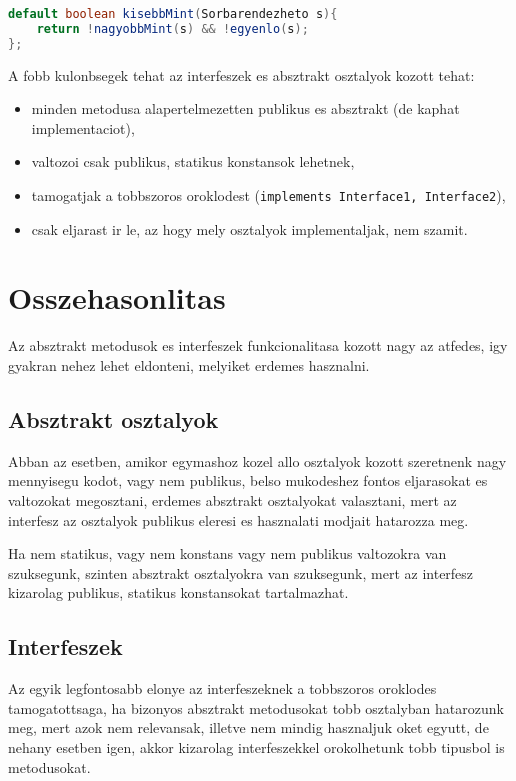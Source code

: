 \documentclass{article}
\let\l\lstinline
\begin{document}
\begin{lstlisting}[language=Java, caption=Default metodus]
default boolean kisebbMint(Sorbarendezheto s){
    return !nagyobbMint(s) && !egyenlo(s);
};
\end{lstlisting}

A fobb kulonbsegek tehat az interfeszek es absztrakt osztalyok kozott tehat:
\begin{itemize}
    \item minden metodusa alapertelmezetten publikus es absztrakt (de kaphat implementaciot),
    \item valtozoi csak publikus, statikus konstansok lehetnek,
    \item tamogatjak a tobbszoros oroklodest (\l{implements Interface1, Interface2}),
    \item csak eljarast ir le, az hogy mely osztalyok implementaljak, nem szamit.
\end{itemize}

\newpage

\section{Osszehasonlitas}

Az absztrakt metodusok es interfeszek funkcionalitasa kozott nagy az atfedes, igy gyakran nehez lehet eldonteni, melyiket erdemes hasznalni.

\subsection{Absztrakt osztalyok}
Abban az esetben, amikor egymashoz kozel allo osztalyok kozott szeretnenk nagy mennyisegu kodot, vagy nem publikus, belso mukodeshez fontos eljarasokat es valtozokat megosztani, erdemes absztrakt osztalyokat valasztani, mert az interfesz az osztalyok publikus eleresi es hasznalati modjait hatarozza meg.

Ha nem statikus, vagy nem konstans vagy nem publikus valtozokra van szuksegunk, szinten absztrakt osztalyokra van szuksegunk, mert az interfesz kizarolag publikus, statikus konstansokat tartalmazhat.

\subsection{Interfeszek}
Az egyik legfontosabb elonye az interfeszeknek a tobbszoros oroklodes tamogatottsaga, ha bizonyos absztrakt metodusokat tobb osztalyban hatarozunk meg, mert azok nem relevansak, illetve nem mindig hasznaljuk oket egyutt, de nehany esetben igen, akkor kizarolag interfeszekkel orokolhetunk tobb tipusbol is metodusokat.
\end{document}
